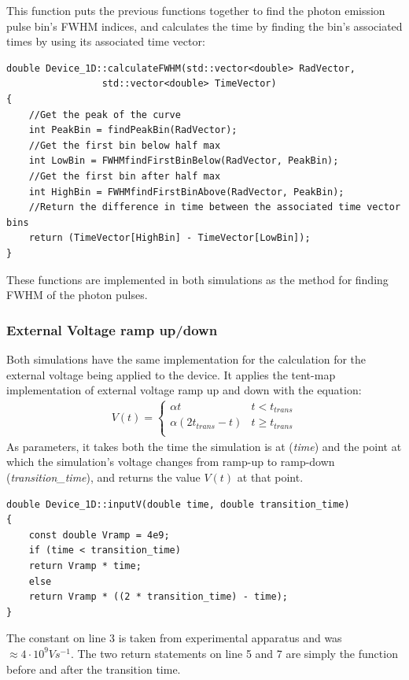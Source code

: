 \documentclass[titlepage]{article}
\begin{document}
This function puts the previous functions together to find the photon emission pulse bin's FWHM indices, and calculates the time by finding the bin's associated times by using its associated time vector:
\begin{lstlisting}[caption = Method for calculating FWHM from an std::vector of values]
double Device_1D::calculateFWHM(std::vector<double> RadVector,
				 std::vector<double> TimeVector)
{
	//Get the peak of the curve
	int PeakBin = findPeakBin(RadVector);
	//Get the first bin below half max
	int LowBin = FWHMfindFirstBinBelow(RadVector, PeakBin);
	//Get the first bin after half max
	int HighBin = FWHMfindFirstBinAbove(RadVector, PeakBin);
	//Return the difference in time between the associated time vector bins
	return (TimeVector[HighBin] - TimeVector[LowBin]);
}
\end{lstlisting}
These functions are implemented in both simulations as the method for finding FWHM of the photon pulses.

\subsubsection{External Voltage ramp up/down}
Both simulations have the same implementation for the calculation for the external voltage being applied to the device. It applies the tent-map implementation of external voltage ramp up and down with the equation:
\begin{eqnarray}
V(t) = \begin{cases}
\alpha t &t < t_{trans}\\
\alpha(2t_{trans} - t) &t \geq t_{trans}\\
\end{cases}
\end{eqnarray}
As parameters, it takes both the time the simulation is at (\textit{time}) and the point at which the simulation's voltage changes from ramp-up to ramp-down (\textit{transition\_time}), and returns the value $V(t)$ at that point.
\begin{lstlisting}
double Device_1D::inputV(double time, double transition_time)
{
	const double Vramp = 4e9;
	if (time < transition_time)
	return Vramp * time;
	else
	return Vramp * ((2 * transition_time) - time);
}
\end{lstlisting} 
The constant on line 3 is taken from experimental apparatus and was $\approx4\cdot10^9 Vs^{-1}$. The two return statements on line 5 and 7 are simply the function before and after the transition time.
\end{document}
